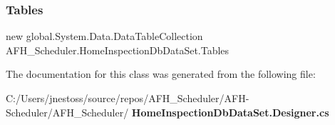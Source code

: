 \mbox{\label{class_a_f_h___scheduler_1_1_home_inspection_db_data_set_a137f398faa06553e001fc87e893b13e2}} 
\subsubsection{Tables}
{\footnotesize\ttfamily new global.\+System.\+Data.\+Data\+Table\+Collection A\+F\+H\+\_\+\+Scheduler.\+Home\+Inspection\+Db\+Data\+Set.\+Tables\hspace{0.3cm}{\ttfamily [get]}}



The documentation for this class was generated from the following file\+:\begin{DoxyCompactItemize}
\item 
C\+:/\+Users/jnestoss/source/repos/\+A\+F\+H\+\_\+\+Scheduler/\+A\+F\+H-\/\+Scheduler/\+A\+F\+H\+\_\+\+Scheduler/\textbf{ Home\+Inspection\+Db\+Data\+Set.\+Designer.\+cs}\end{DoxyCompactItemize}
